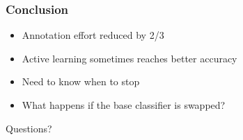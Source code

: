 \documentclass{beamer}
\begin{document}
\begin{frame}
\frametitle{Conclusion}
\begin{itemize}
\item Annotation effort reduced by 2/3
\item Active learning sometimes reaches better accuracy
\item Need to know when to stop
\item What happens if the base classifier is swapped?
\end{itemize}
\end{frame}

\begin{frame}
Questions?
\end{frame}
\end{document}
